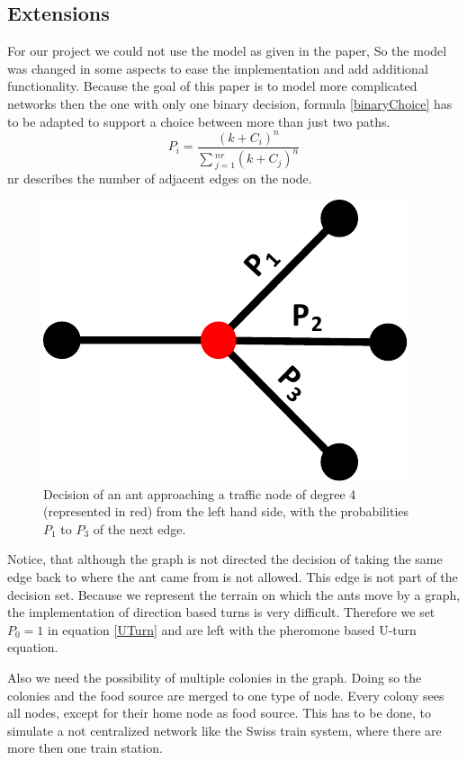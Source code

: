 \subsection{Extensions}
 For our project we could not use the model as given in the paper, So the model was changed in some aspects to ease the implementation and add additional functionality. Because the goal of this paper is to model more complicated networks then the one with only one binary decision, formula \ref{binaryChoice} has to be adapted to support a choice between more than just two paths. 
\begin{equation} \label{multiDecisions}
P_i = \frac{(k+C_i)^n}{\sum{_{j=1}^{nr}(k+C_j)^n}}
\end{equation}  
 nr describes the number of adjacent edges on the node.
\begin{figure}[H]
	\centering
	\includegraphics[scale=0.5]{decision3.pdf}
	\caption{Decision of an ant approaching a traffic node of degree 4 (represented in red) from the left hand side, with the probabilities $P_1$ to $P_3$ of the next edge.}
\end{figure}
Notice, that although the graph is not directed the decision of taking the same edge back to where the ant came from is not allowed. This edge is not part of the decision set.
Because we represent the terrain on which the ants move by a graph, the implementation of direction based turns is very difficult. Therefore we set $P_0 = 1$ in equation \ref{UTurn} and are left with the pheromone based U-turn equation.

Also we need the possibility of multiple colonies in the graph. Doing so the colonies and the food source are merged to one type of node. Every colony sees all nodes, except for their home node as food source. This has to be done, to simulate a not centralized network like the Swiss train system, where there are more then one train station.

